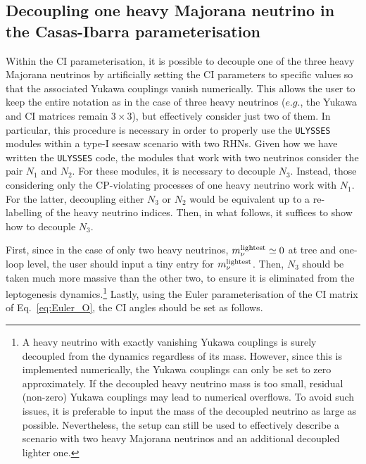 \documentclass[12pt, a4paper]{article}
\newcommand{\mnulight}{m_{\nu}^{\rm lightest}}
\begin{document}
\begin{table}[h!]
 \caption{Overview of \texttt{ULYSSES}'s input parameters. The parameters in (a) are common to all the provided parameterisations of the Yukawa, those in (b-left) are specific to the Euler parameterisation of the CI matrix, those in (b-right) are for the alternative one, those in (c) are for the manual setting.}
 \label{tab:full_param_overview}
\end{table}


\subsection{Decoupling one heavy Majorana neutrino in the Casas-Ibarra parameterisation}\label{ssec:RHNdecouple}
Within the CI parameterisation, it is possible to decouple one of the three heavy Majorana neutrinos by artificially setting the CI parameters to specific values so that the associated Yukawa couplings vanish numerically. This allows the user to keep the entire notation as in the case of three heavy neutrinos ($e.g.$, the Yukawa and CI matrices remain $3\times 3$), but effectively consider just two of them. In particular, this procedure is necessary in order to properly use the \texttt{ULYSSES} modules within a type-I seesaw scenario with two RHNs. Given how we have written the \texttt{ULYSSES} code, the modules that work with two neutrinos consider the pair $N_1$ and $N_2$. For these modules, it is necessary to decouple $N_3$. Instead, those considering only the CP-violating processes of one heavy neutrino work with $N_1$. For the latter, decoupling either $N_3$ or $N_2$ would be equivalent up to a re-labelling of the heavy neutrino indices. Then, in what follows, it suffices to show how to decouple $N_3$. 

First, since in the case of only two heavy neutrinos, $\mnulight \simeq 0$ at tree and one-loop level, the user should input a tiny entry for $\mnulight$. 
Then, $N_3$ should be taken much more massive than the other two, to ensure it is eliminated from the leptogenesis dynamics.\footnote{A heavy neutrino with exactly vanishing Yukawa couplings is surely decoupled from the dynamics regardless of its mass. However, since this is implemented numerically, the Yukawa couplings can only be set to zero approximately. If the decoupled heavy neutrino mass is too small, residual (non-zero) Yukawa couplings may lead to numerical overflows. To avoid such issues, it is preferable to input the mass of the decoupled neutrino as large as possible. Nevertheless, the setup can still be used to effectively describe a scenario with two heavy Majorana neutrinos and an additional decoupled lighter one.} Lastly, using the Euler parameterisation of the CI matrix of Eq.~\eqref{eq:Euler_O}, the CI angles should be set as follows.
\end{document}
